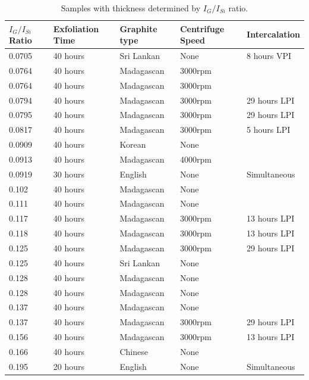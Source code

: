 \documentclass[12pt,titlepage]{article}
\begin{document}
	\begin{table}
		\begin{scriptsize}	
			\begin{tabularx}{\textwidth}{X X X X X}
				\hline
				$I_G/I_{Si}$ Ratio & Exfoliation Time & Graphite type & Centrifuge Speed & Intercalation \\
				\hline
				0.0705 & 40 hours & Sri Lankan & None & 8 hours VPI \\
				0.0764 & 40 hours & Madagascan & 3000rpm & \\
				0.0764 & 40 hours & Madagascan & 3000rpm & \\
				0.0794 & 40 hours & Madagascan & 3000rpm & 29 hours LPI \\
				0.0795 & 40 hours & Madagascan & 3000rpm & 29 hours LPI \\
				0.0817 & 40 hours & Madagascan & 3000rpm & 5 hours LPI\\
				0.0909 & 40 hours & Korean & None & \\
				0.0913 & 40 hours & Madagascan & 4000rpm & \\
				0.0919 & 30 hours & English & None & Simultaneous\\
				0.102 & 40 hours & Madagascan & None & \\
				0.111 & 40 hours & Madagascan & None & \\
				0.117 & 40 hours & Madagascan & 3000rpm & 13 hours LPI \\
				0.118 & 40 hours & Madagascan & 3000rpm & 13 hours LPI \\
				0.125 & 40 hours & Madagascan & 3000rpm & 29 hours LPI \\
				0.125 & 40 hours & Sri Lankan & None & \\
				0.128 & 40 hours & Madagascan & None & \\
				0.128 & 40 hours & Madagascan & None & \\
				0.137 & 40 hours & Madagascan & None & \\
				0.137 & 40 hours & Madagascan & 3000rpm & 29 hours LPI\\
				0.156 & 40 hours & Madagascan & 3000rpm & 13 hours LPI\\
				0.166 & 40 hours & Chinese & None & \\
				0.195 & 20 hours & English & None & Simultaneous \\
			\end{tabularx}
		\end{scriptsize}
		\caption[Samples with thickness determined by $I_G/I_{Si}$ ratio.]{Samples with thickness determined by $I_G/I_{Si}$ ratio.}
		\label{tab:thickness-data}
	\end{table}
	
\end{document}
